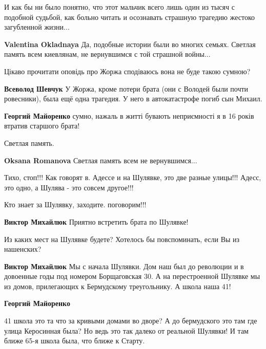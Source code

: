 \begin{itemize}

И как бы ни было понятно, что этот мальчик всего лишь один из тысяч с подобной
судьбой, как больно читать и осознавать страшную трагедию жестоко загубленной
жизни...

\begin{itemize} %
\textbf{Valentina Okladnaya} Да, подобные истории были во многих семьях. Светлая память всем киевлянам, не вернувшимся с той страшной войны...
\end{itemize} %

Цікаво прочитати оповідь про Жоржа сподіваюсь вона не буде такою сумною?

\begin{itemize} %
\textbf{Всеволод Шевчук} У Жоржа, кроме потери брата (они с Володей были почти ровесники), была ещё одна трагедия. У него в автокатастрофе погиб сын Михаил.

\textbf{Георгий Майоренко} сумно, нажаль в житті бувають неприємності я в 16 років втратив старшого брата!
\end{itemize} %

Светлая память.

\textbf{Oksana Romanova} Светлая память всем не вернувшимся...

Тихо, стоп!!! Как говорят в. Адессе и на Шулявке, это две разные улицы!!!
Адесс, это одно, а Шулява - это совсем другое!!!

\begin{itemize} %
Кто знает за Шулявку, заходите. поговорим!!!

\begin{itemize} %
\textbf{Виктор Михайлюк} Приятно встретить брата по Шулявке!

Из каких мест на Шулявке будете? Хотелось бы повспоминать, если Вы из нашенских?

\textbf{Виктор Михайлюк} Мы с начала Шулявки. Дом наш был до революции и в довоенные годы под номером Борщаговская 30. А на перестроенной Шулявке мы из домов, прилегающих к Бермудскому треугольнику. А школа наша 41!

\textbf{Георгий Майоренко} 

41 школа это та что за кривыми домами во дворе? А до бермудского это там где
улица Керосинная была? Но ведь это так далеко от реальной Шулявки! И там ближе
65-я школа была, что ближе к Старту.



\end{itemize}
\end{itemize}
\end{itemize}
